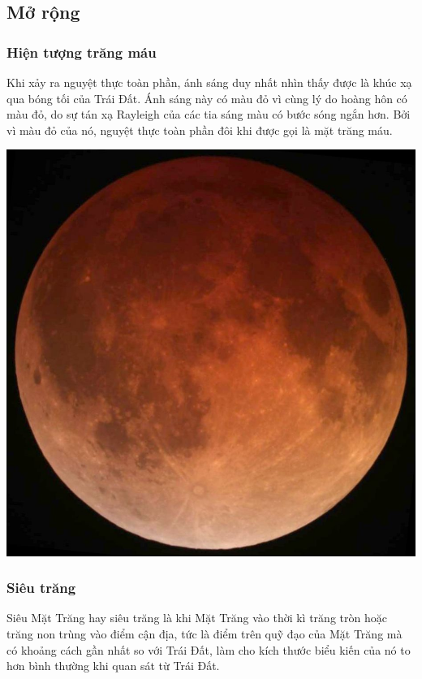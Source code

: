 \subsection{Mở rộng}
\subsubsection{Hiện tượng trăng máu}
\begin{minipage}{0.6\textwidth}
	Khi xảy ra nguyệt thực toàn phần, ánh sáng duy nhất nhìn thấy được là khúc xạ qua bóng tối của Trái Đất. Ánh sáng này có màu đỏ vì cùng lý do hoàng hôn có màu đỏ, do sự tán xạ Rayleigh của các tia sáng màu có bước sóng ngắn hơn. Bởi vì màu đỏ của nó, nguyệt thực toàn phần đôi khi được gọi là mặt trăng máu.
\end{minipage}
\begin{minipage}{0.4\textwidth}
	\begin{center}
		\includegraphics[width=0.5\linewidth]{../figs/G10-035-5}
	\end{center}
	
\end{minipage}

\subsubsection{Siêu trăng}
Siêu Mặt Trăng hay siêu trăng là khi Mặt Trăng vào thời kì trăng tròn hoặc trăng non trùng vào điểm cận địa, tức là điểm trên quỹ đạo của Mặt Trăng mà có khoảng cách gần nhất so với Trái Đất, làm cho kích thước biểu kiến của nó to hơn bình thường khi quan sát từ Trái Đất.
